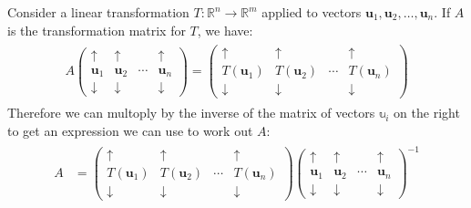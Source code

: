 \documentclass[letterpaper,10pt,english]{jupyterBook}
\begin{document}
\sphinxAtStartPar
Consider a linear transformation \(T: \mathbb{R}^n \to \mathbb{R}^m\) applied to vectors \(\mathbf{u}_1, \mathbf{u}_2, \ldots, \mathbf{u}_n\). If \(A\) is the transformation matrix for \(T\), we have:
\begin{equation*}
\begin{split} \begin{align*}
    A
    \begin{pmatrix}
        \uparrow & \uparrow & & \uparrow \\
        \mathbf{u}_1 & \mathbf{u}_2 & \cdots & \mathbf{u}_n \\
        \downarrow & \downarrow & & \downarrow
    \end{pmatrix} =
    \begin{pmatrix}
        \uparrow & \uparrow & & \uparrow \\
        T(\mathbf{u}_1) & T(\mathbf{u}_2) & \cdots & T(\mathbf{u}_n) \\
        \downarrow & \downarrow & & \downarrow
    \end{pmatrix}
\end{align*} \end{split}
\end{equation*}
\sphinxAtStartPar
Therefore we can multoply by the inverse of the matrix of vectors \(\mathbb{u}_i\) on the right to get an expression we can use to work out \(A\):
\begin{equation*}
\begin{split} \begin{align*}
    A &=  
    \begin{pmatrix}
        \uparrow & \uparrow & & \uparrow \\
        T(\mathbf{u}_1) & T(\mathbf{u}_2) & \cdots & T(\mathbf{u}_n) \\
        \downarrow & \downarrow & & \downarrow
    \end{pmatrix}
    \begin{pmatrix}
        \uparrow & \uparrow & & \uparrow \\
        \mathbf{u}_1 & \mathbf{u}_2 & \cdots & \mathbf{u}_n \\
        \downarrow & \downarrow & & \downarrow
    \end{pmatrix}^{-1}
\end{align*} \end{split}
\end{equation*}\label{_pages/6.1_Transformation_matrices:finding-transformation-matrix-theorem}
\end{document}

